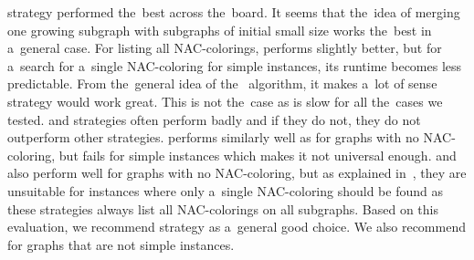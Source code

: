 \MergeLinear{} strategy performed the~best across the~board.
It seems that the~idea of merging one growing subgraph
with subgraphs of initial small size works the~best
in a~general case.
%
For listing all NAC-colorings, \SharedVertices{} performs
slightly better, but for a~search for a~single NAC-coloring for simple instances,
its runtime becomes less predictable.
%
From the~general idea of the~\Subgraphs{} algorithm,
it makes a~lot of sense \Log{} strategy would work great.
This is not the~case as \Log{} is slow for all the~cases we tested.
%
\MinMax{} and \SortedBits{} strategies often perform badly
and if they do not, they do not outperform other strategies.
%
\PromisingCycles{} performs similarly well as \Neighbors{}
for graphs with no NAC-coloring,
but fails for simple instances which makes it not universal enough.
%
\SortedSize{} and \Score{} also perform well for graphs with no NAC-coloring,
but as explained in~,
they are unsuitable for instances where only a~single NAC-coloring
should be found as these strategies always list all NAC-colorings
on all subgraphs.
%
Based on this evaluation, we recommend strategy \MergeLinear{} as a~general good choice.
We also recommend \SharedVertices{} for graphs that are not simple instances.


